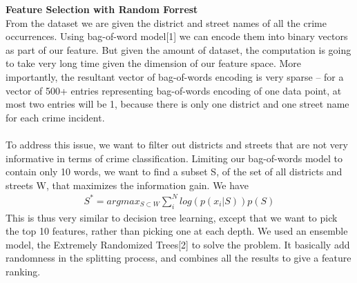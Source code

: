 \documentclass[12pt]{article}
\newenvironment{p3}[2][Methods]{\begin{trivlist}
\item[\hskip \labelsep {\bfseries #1}\hskip \labelsep {\bfseries #2}]}{\end{trivlist}}
\begin{document}
\begin{p3}{}
\item{\textbf{Feature Selection with Random Forrest\\}}
From the dataset we are given the district and street names of all the crime occurrences. Using bag-of-word model[1] we can encode them into binary vectors as part of our feature. But given the amount of dataset, the computation is going to take very long time given the dimension of our feature space. More importantly, the resultant vector of bag-of-words encoding is very sparse -- for a vector of 500+ entries representing bag-of-words encoding of one data point, at most two entries will be 1, because there is only one district and one street name for each crime incident.\\\\
To address this issue, we want to filter out districts and streets that are not very informative in terms of crime classification. Limiting our bag-of-words model to contain only 10 words, we want to find a subset S, of the set of all districts and streets W, that maximizes the information gain. We have
\begin{align*}
	S^* = argmax_{S \subset W} \sum_i^N log(p(x_i|S)) p(S)
\end{align*}
This is thus very similar to decision tree learning, except that we want to pick the top 10 features, rather than picking one at each depth. We used an ensemble model, the Extremely Randomized Trees[2] to solve the problem. It basically add randomness in the splitting process, and combines all the results to give a feature ranking.
\end{p3}
\end{document}

